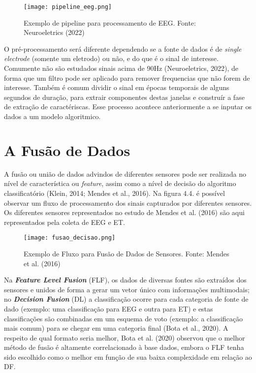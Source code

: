  \begin{figure}[!h]
      \centering
      \texttt{[image: pipeline\_eeg.png]}
      \caption{Exemplo de pipeline para processamento de EEG. Fonte: Neuroeletrics (2022)}
 \end{figure}


 O pré-processamento será diferente dependendo se a fonte de dados é de \textit{single electrode} (somente um eletrodo)
 ou não, e do que é o sinal de interesse. Comumente não são estudados sinais acima de 90Hz (Neuroeletrics, 2022), 
 de forma que um filtro pode ser aplicado para remover frequencias que não forem de interesse. 
Também é comum dividir o sinal em épocas temporais de alguns segundos de duração, para extrair 
componentes destas janelas e construír a fase de extração de caractériscas. Esse processo acontece 
anteriormente a se inputar os dados a um modelo algoritmico. 

\section{A Fusão de Dados}
A fusão ou união de dados advindos de diferentes sensores pode ser realizada no nível de característica ou \textit{feature},
assim como a nível de decisão do algoritmo classificatório (Klein, 2014; Mendes et al., 2016).
      Na figura 4.4. é possível observar um fluxo de processamento dos sinais capturados por diferentes sensores.  Os diferentes 
      sensores representados no estudo de Mendes et al. (2016) são aqui representados pela coleta de EEG e ET.
 
\begin{figure}
      \centering
      \texttt{[image: fusao\_decisao.png]}
      \caption{Exemplo de Fluxo para Fusão de Dados de Sensores. Fonte:  Mendes et al. (2016)}
\end{figure}


Na \textit{\textbf{Feature Level Fusion}} (FLF), os dados de diversas fontes são extraídos dos sensores e unidos de forma a 
gerar um vetor único com informações multimodais; no \textit{\textbf{Decision Fusion}} (DL) a classificação ocorre para cada categoria 
de fonte de dado (exemplo: uma classificação para EEG e outra para ET) e estas 
classificações são combinadas em um esquema de voto (exemplo: a classificação mais comum) 
para se chegar em uma categoria final (Bota et al., 2020). A respeito de qual formato seria melhor, 
Bota et al. (2020) observou que o melhor método de fusão é altamente correlacionado à base dados, 
embora o FLF tenha sido escolhido como o melhor em função de sua baixa complexidade em relação ao DF. 




